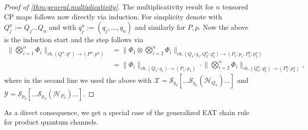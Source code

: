 \documentclass[11pt]{article}
\newcommand{\1}{\ensuremath{\mathbbm{1}}}
\theoremstyle{newdefinition}
\theoremstyle{newplain}
\theoremstyle{myplain}
\begin{document}
\begin{proof}[Proof of \cref{thm:general.multiplicativity}]
The multiplicativity result for $n$ tensored CP maps follows now directly via induction. For simplicity denote with $Q^n_j:=Q_j...Q_n$ and with $q_j^n:=(q_j,...,q_n)$ and similarly for $P, p$. Now the above is the induction start and the step follows via
\begin{align}
\bigg\|\bigotimes_{i=1}^n\Phi_i\bigg\|_{cb,(Q^n:q^n)\to (P^n:p^n)} &= \bigg\|\Phi_1\otimes\bigotimes_{i=2}^n\Phi_i\bigg\|_{cb,(Q_1:q_1,Q_2^n:q_2^n)\to (P_1:p_1,P_2^n:p_2^n)} \\ 
    &=\|\Phi_i\|_{cb,(Q_1:q_1)\to (P_1:p_1)}\cdot \bigg\|\bigotimes_{i=2}^n\Phi_i\bigg\|_{cb,(Q_2^n:q_2^n)\to (P_2^n:p_2^n)},
\end{align} where in the second line we used the above with $\mathcal{X}=\mathcal{S}_{q_2}[...\mathcal{S}_{q_n}(\mathcal{H}_{Q_n})...]$ and $\mathcal{Y}=\mathcal{S}_{p_2}[...\mathcal{S}_{p_n}(\mathcal{H}_{P_n})...]$.
\end{proof}

As a direct consequence, we get a special case of the generalized EAT chain rule~\cite{Metger.2024} for product quantum channels.
\end{document}
